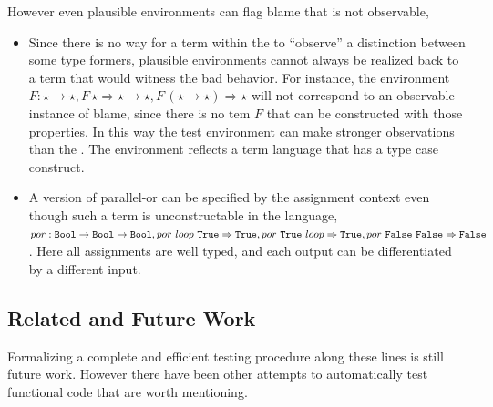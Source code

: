  However even plausible environments can flag blame that is not observable,
 \begin{itemize}
 \item
 Since there is no way for a term within the \clang{} to ``observe'' a distinction between some type formers, plausible environments cannot always be realized back to a term that would witness the bad behavior.
 For instance, the environment $F:\star\rightarrow\star,F\,\star \Rightarrow \star\rightarrow\star,F\,\left(\star\rightarrow\star\right) \Rightarrow \star$
  will not correspond to an observable instance of blame, since there is no tem $F$ that can be constructed with those properties.
 In this way the test environment can make stronger observations than the \clang{}.
 The environment reflects a term language that has a type case construct.
 \item
 A version of parallel-or can be specified by the assignment context even though such a term is unconstructable in the language, $por:\Bool{}\rightarrow\Bool{}\rightarrow\Bool{},por\ loop\ \True{} \Rightarrow  \True{}, por\ \True{} \ loop \Rightarrow \True{},por\ \False{}\ \False{} \Rightarrow  \False{}$.
 Here all assignments are well typed, and each output can be differentiated by a different input.
\end{itemize}
  
\subsection{Related and Future Work}
 
Formalizing a complete and efficient testing procedure along these lines is still future work.
However there have been other attempts to automatically test functional code that are worth mentioning.
 

